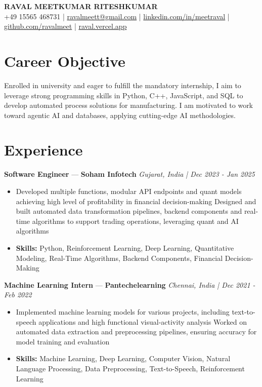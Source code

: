 \documentclass[a4paper,10pt]{article}
\begin{document}
\begin{center}
  {\Large\bfseries RAVAL MEETKUMAR RITESHKUMAR}\\[2pt]
  {\small +49 15565 468731 \;|\; \href{mailto:ravalmeett@gmail.com}{ravalmeett@gmail.com} \;|\; \href{https://www.linkedin.com/in/meetraval/}{linkedin.com/in/meetraval} \;|\; \href{https://github.com/ravalmeet}{github.com/ravalmeet} \;|\; \href{https://raval.vercel.app/}{raval.vercel.app}}
\end{center}
\vspace{-3pt}

\section*{Career Objective}
Enrolled in university and eager to fulfill the mandatory internship, I aim to leverage strong programming skills in Python, C++, JavaScript, and SQL to develop automated process solutions for manufacturing. I am motivated to work toward agentic AI and databases, applying cutting-edge AI methodologies.\par

\section*{Experience}
\textbf{Software Engineer} — \textbf{Soham Infotech} \hfill \textit{Gujarat, India \;|\; Dec 2023 - Jan 2025}\par
\vspace{1pt}
\begin{itemize}
  \item Developed multiple functions, modular API endpoints and quant models achieving high level of profitability in financial decision-making Designed and built automated data transformation pipelines, backend components and real-time algorithms to support trading operations, leveraging quant and AI algorithms
  \item \textbf{Skills:} Python, Reinforcement Learning, Deep Learning, Quantitative Modeling, Real-Time Algorithms, Backend Components, Financial Decision-Making
\end{itemize}
\vspace{3pt}
\textbf{Machine Learning Intern} — \textbf{Pantechelearning} \hfill \textit{Chennai, India \;|\; Dec 2021 - Feb 2022}\par
\vspace{1pt}
\begin{itemize}
  \item Implemented machine learning models for various projects, including text-to-speech applications and high functional visual-activity analysis Worked on automated data extraction and preprocessing pipelines, ensuring accuracy for model training and evaluation
  \item \textbf{Skills:} Machine Learning, Deep Learning, Computer Vision, Natural Language Processing, Data Preprocessing, Text-to-Speech, Reinforcement Learning
\end{itemize}
\end{document}
